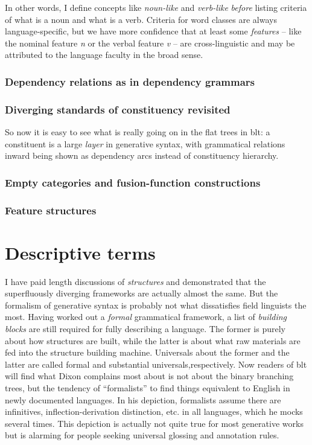 \documentclass[../main.tex]{subfiles}
\begin{document}
In other words, I define concepts like \emph{noun-like} and \emph{verb-like} \emph{before} listing criteria of 
what is a noun and what is a verb. Criteria for word classes are always language-specific, but we have more 
confidence that at least some \emph{features} -- like the nominal feature \textit{n} or the verbal feature 
\textit{v} -- are cross-linguistic and may be attributed to the language faculty in the broad sense. 

\subsubsection{Dependency relations as in dependency grammars}\label{sec:dependency}



\subsubsection{Diverging standards of constituency revisited}

So now it is easy to see what is really going on in the flat trees in \ac{blt}: a constituent
is a large \emph{layer} in generative syntax, with grammatical relations inward being shown as 
dependency arcs instead of constituency hierarchy. 

\subsubsection{Empty categories and fusion-function constructions}

\subsubsection{Feature structures}


\section{Descriptive terms}\label{sec:descriptive-terms}

I have paid length discussions of \emph{structures} 
and demonstrated that the superfluously diverging frameworks are actually almost the same. 
But the formalism of generative syntax is probably not what dissatisfies field linguists the most.
Having worked out a \emph{formal} grammatical framework, 
a list of \emph{building blocks} are still required for fully describing a language. 
The former is purely about how structures are built, 
while the latter is about what raw materials are fed into the structure building machine. 
Universals about the former and the latter are called formal and substantial universals,respectively. 
Now readers of \ac{blt} will find 
what Dixon complains most about is not about the binary branching trees, 
but the tendency of ``formalists'' to find things equivalent to English in newly documented languages. 
In his depiction, formalists assume there are infinitives, 
inflection-derivation distinction, etc. in all languages, which he mocks several times. 
This depiction is actually not quite true for most generative works 
but is alarming for people seeking universal glossing and annotation rules.
\end{document}
